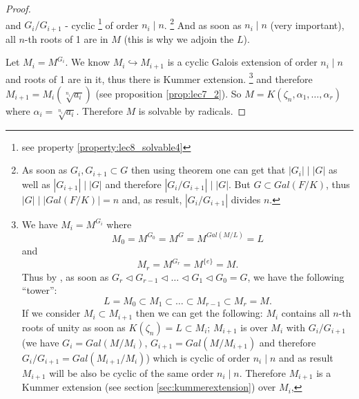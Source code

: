 \begin{theorem}
\begin{proof}
\[    \]
    and $G_i/G_{i+1}$ - cyclic
    \footnote{
      see property \ref{property:lec8_solvable4}
    }
    of order $n_i \mid n$.
    \footnote{
      As soon as $G_i, G_{i+1} \subset G$ then using
       theorem one can get that
      $\left|G_i\right| \mid \left|G\right|$ as well as
      $\left|G_{i+1}\right| \mid \left|G\right|$ and therefore
      $\left|G_i/G_{i+1}\right| \mid \left|G\right|$. But
      $G \subset Gal\left(F/K\right)$, thus
      $\left|G\right| \mid \left|Gal\left(F/K\right)\right| = n$ and, as
      result, $\left|G_i/G_{i+1}\right|$ divides $n$.
    }
    And as soon as
    $n_i \mid n$ (very important), all $n$-th roots of 1 are in $M$
    (this is why we adjoin the $L$).

    Let $M_i = M^{G_i}$. We know $M_i \hookrightarrow M_{i+1}$ is a
    cyclic Galois extension of order $n_i \mid n$ and roots of 1 are
    in it, thus there is Kummer extension.
    \footnote{
      We have $M_i = M^{G_i}$ where
      \[
      M_0 = M^{G_0} = M^G = M^{Gal\left(M/L\right)} = L
      \]
      and
      \[
      M_r = M^{G_r} = M^{\{e\}} = M.
      \]
      Thus by ,
      as soon as
      $G_r \triangleleft G_{r-1} \triangleleft \dots \triangleleft G_1
      \triangleleft G_0 = G$,
      we have the
      following ``tower'':
      \[
      L = M_0 \subset M_1 \subset \dots \subset M_{r-1} \subset M_r = M.
      \]
      If we consider $M_i \subset M_{i+1}$ then we can get the
      following: $M_i$ contains all $n$-th roots of unity as soon as
      $K\left(\zeta_n\right) = L \subset M_i$; $M_{i+1}$ is
       over $M_i$ with
       $G_i/G_{i+1}$
      (we have $G_i = Gal\left(M/M_i\right)$,
      $G_{i+1} = Gal\left(M/M_{i+1}\right)$ and therefore
      $G_i/G_{i+1} = Gal\left(M_{i+1}/M_i\right)$)
      which is cyclic of order
      $n_i \mid n$ and as
      result $M_{i+1}$ will be also be cyclic of the same order $n_i
      \mid n$. Therefore $M_{i+1}$ is a Kummer extension 
      (see section \ref{sec:kummerextension}) over $M_i$,
    }
    and therefore
    $M_{i+1} = M_i\left(\sqrt[n_i]{a_i}\right)$ (see proposition
    \ref{prop:lec7_2}).
    So $M = K\left(\zeta_n, \alpha_1, \dots, \alpha_r\right)$ where
    $\alpha_i = \sqrt[n_i]{a_i}$. Therefore $M$ is solvable by
    radicals.


\end{proof}
\end{theorem}
